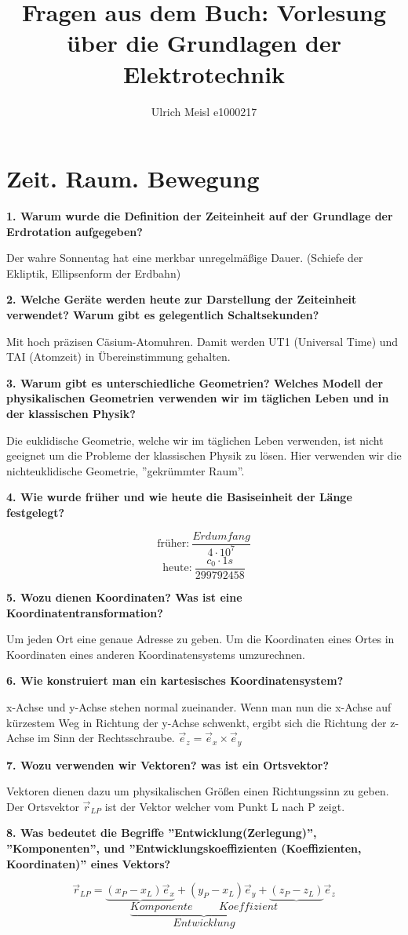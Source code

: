 \documentclass[12pt,a4paper,twoside]{book}
\author{Ulrich Meisl e1000217}
\title{Fragen aus dem Buch: Vorlesung über die Grundlagen der Elektrotechnik}
\newcommand{\nqu}[1]{\vspace*{10mm} \noindent \textbf{#1} \par \vspace*{1mm}}
\begin{document}
\maketitle
\thispagestyle{empty}

\chapter{Zeit. Raum. Bewegung}

\nqu{1. Warum wurde die Definition der Zeiteinheit auf der Grundlage der Erdrotation aufgegeben?}
Der wahre Sonnentag hat eine merkbar unregelmäßige Dauer. (Schiefe der Ekliptik, Ellipsenform der Erdbahn) 

\nqu{2. Welche Geräte werden heute zur Darstellung der Zeiteinheit verwendet? Warum gibt es gelegentlich Schaltsekunden?}
Mit hoch präzisen Cäsium-Atomuhren. Damit werden UT1 (Universal Time) und TAI (Atomzeit) in Übereinstimmung gehalten.

\nqu{3. Warum gibt es unterschiedliche Geometrien? Welches Modell der physikalischen Geometrien verwenden wir im täglichen Leben und in der klassischen Physik?}
Die euklidische Geometrie, welche wir im täglichen Leben verwenden, ist nicht geeignet um die Probleme der klassischen Physik zu lösen. Hier verwenden wir die nichteuklidische Geometrie, ''gekrümmter Raum''.

\nqu{4. Wie wurde früher und wie heute die Basiseinheit der Länge festgelegt?}
\[\textrm{früher:}~ \frac{Erdumfang}{4 \cdot 10^7} \]
\[\textrm{heute:}~ \frac{c_0 \cdot 1s}{299792458} \]

\nqu{5. Wozu dienen Koordinaten? Was ist eine Koordinatentransformation?}
Um jeden Ort eine genaue Adresse zu geben. Um die Koordinaten eines Ortes in Koordinaten eines anderen Koordinatensystems umzurechnen.

\nqu{6. Wie konstruiert man ein kartesisches Koordinatensystem?}
x-Achse und y-Achse stehen normal zueinander. Wenn man nun die x-Achse auf kürzestem Weg in Richtung der y-Achse schwenkt, ergibt sich die Richtung der z-Achse im Sinn der Rechtsschraube. $ \vec{e}_z = \vec{e}_x \times \vec{e}_y$

\nqu{7. Wozu verwenden wir Vektoren? was ist ein Ortsvektor?}
Vektoren dienen dazu um physikalischen Größen einen Richtungssinn zu geben.
Der Ortsvektor $\vec{r}_{LP}$ ist der Vektor welcher vom Punkt L nach P zeigt.

\nqu{8. Was bedeutet die Begriffe ''Entwicklung(Zerlegung)'', ''Komponenten'', und ''Entwicklungskoeffizienten (Koeffizienten, Koordinaten)'' eines Vektors?}
\[\vec{r}_{LP} = \underbrace{(x_P - x_L)\vec{e}_x}+(y_P-x_L)\vec{e}_y+\underbrace{(z_P-z_L)}\vec{e}_z\]
\[\underbrace{Komponente \hspace{1cm}Koeffizient}\]
\[Entwicklung\]
\end{document}
